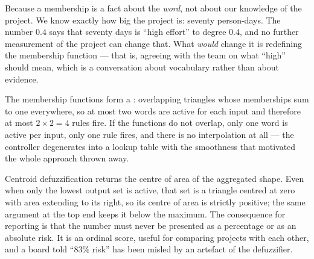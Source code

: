 \begin{ans}
  \item Because a membership is a fact about the \emph{word}, not about our
        knowledge of the project. We know exactly how big the project is: seventy
        person-days. The number $0.4$ says that seventy days is ``high effort'' to
        degree $0.4$, and no further measurement of the project can change that.
        What \emph{would} change it is redefining the membership function --- that
        is, agreeing with the team on what ``high'' should mean, which is a
        conversation about vocabulary rather than about evidence.
  \item The membership functions form a : overlapping
        triangles whose memberships sum to one everywhere, so at most two words are
        active for each input and therefore at most $2 \times 2 = 4$ rules fire.
        If the functions do not overlap, only one word is active per input, only one
        rule fires, and there is no interpolation at all --- the controller
        degenerates into a lookup table with the smoothness that motivated the whole
        approach thrown away.
  \item Centroid defuzzification returns the centre of area of the aggregated shape.
        Even when only the lowest output set is active, that set is a triangle
        centred at zero with area extending to its right, so its centre of area is
        strictly positive; the same argument at the top end keeps it below the
        maximum. The consequence for reporting is that the number must never be
        presented as a percentage or as an absolute risk. It is an ordinal score,
        useful for comparing projects with each other, and a board told ``$83\%$
        risk'' has been misled by an artefact of the defuzzifier.
\end{ans}

